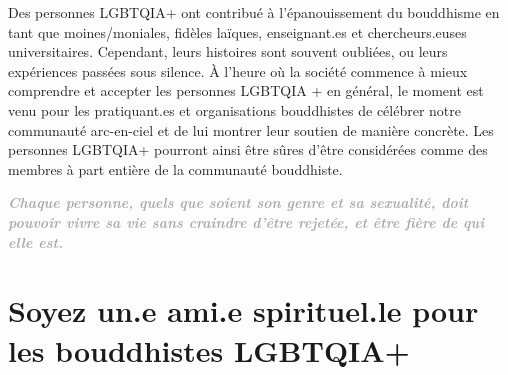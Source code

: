 \documentclass[12pt,openany]{book}
\renewenvironment{quote}{%
  \list{}{%
    \leftmargin-0.1cm   %
    \rightmargin\leftmargin
  }
  \item\relax
}
{\endlist}
\begin{document}
\noindent Des personnes \mbox{LGBTQIA+} ont contribué à l’épanouissement du bouddhisme en tant que moines/moniales, fidèles laïques, enseignant.es et chercheurs.euses universitaires.
Cependant, leurs histoires sont souvent oubliées, ou leurs expériences passées sous silence.
À l’heure où la société commence à mieux comprendre et accepter les personnes LGBTQIA + en général, le moment est venu pour les pratiquant.es et organisations bouddhistes de célébrer notre communauté arc-en-ciel et de lui montrer leur soutien de manière concrète.
Les personnes \mbox{LGBTQIA+} pourront ainsi être sûres d’être considérées comme des membres à part entière de la communauté bouddhiste.

\begingroup
\begin{figure}[h]
    \centering
\end{figure}

\begin{quote}
\centering
\doublespacing
\textit{\Large \textbf{\textcolor{darkgray}{Chaque personne, quels que soient son genre et sa sexualité, doit pouvoir vivre sa vie sans craindre d’être rejetée, et être fière de qui elle est.}}}
\end{quote}
\endgroup

\chapter*{Soyez un.e ami.e spirituel.le pour les bouddhistes \mbox{LGBTQIA+}}
\end{document}
